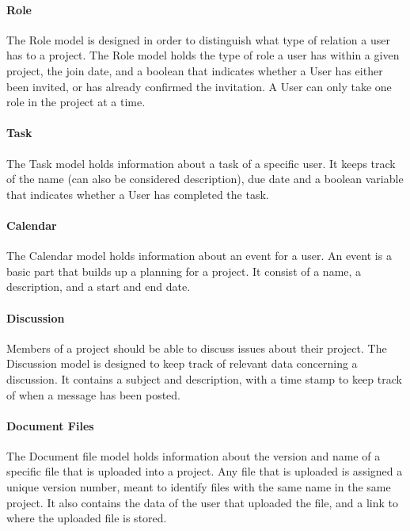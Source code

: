 \paragraph{Role}

The Role model is designed in order to distinguish what type of relation a user has to a project. The Role model holds the type of role a user has 
within a given project, the join date, and a boolean that indicates whether a User has either been invited, or has already confirmed the invitation. A
User can only take one role in the project at a time. 

\paragraph{Task} %
The Task model holds information about a task of a specific user. It keeps track of the name (can also be considered description), due date and a 
boolean variable that indicates whether a User has completed the task.

\paragraph{Calendar} %

The Calendar model holds information about an event for a user. An event is a basic part that builds up a planning for a project. It consist of a name,
a description, and a start and end date. 

\paragraph{Discussion} %
Members of a project should be able to discuss issues about their project. The Discussion model is designed to keep track of relevant data concerning a 
discussion. It contains a subject and description, with a time stamp to keep track of when a message has been posted. 

\paragraph{Document Files} %
The Document file model holds information about the version and name of a specific file that is uploaded into a project. Any file that is uploaded is 
assigned a unique version number, meant to identify files with the same name in the same project. It also contains the data of the user that uploaded
the file, and a link to where the uploaded file is stored.

